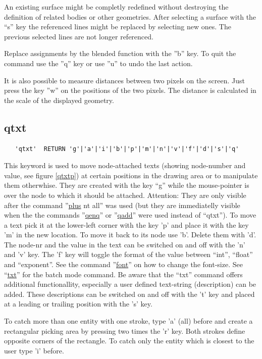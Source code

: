\documentclass{article}
\providecommand{\htmlref}[2]{\hyperref[#2]{#1}}
\begin{document}
An existing surface might be completly redefined without destroying the definition of related bodies or other geometries. After selecting a surface with the ``s'' key the referenced lines might be replaced by selecting new ones. The previous selected lines are not longer referenced.

Replace assignments by the blended function with the ''b'' key. To quit the command use the ''q'' key or use ''u'' to undo the last action. 

It is also possible to measure distances between two pixels on the screen. Just press the key ''w'' on the positions of the two pixels. The distance is calculated in the scale of the displayed geometry. 

\subsection{\label{qtxt}qtxt}
\begin{verbatim}
   'qtxt'  RETURN 'g'|'a'|'i'|'b'|'p'|'m'|'n'|'v'|'f'|'d'|'s'|'q' 
\end{verbatim}
This keyword is used to move node-attached texts (showing node-number and value, see figure \ref{qtxtp}) at certain positions in the drawing area or to manipulate them otherwhise. They are created with the key ``g'' while the mouse-pointer is over the node to which it should be attached. Attention: They are only visible after the command ''\htmlref{plus}{plus} nt all'' was used (but they are immediatelly visible when the the commands ''\htmlref{qenq}{qenq}'' or ''\htmlref{qadd}{qadd}'' were used instead of ``qtxt''). To move a text pick it at the lower-left corner with the key 'p' and place it with the key 'm' in the new location. To move it back to its node use 'b'. Delete them with 'd'. The node-nr and the value in the text can be switched on and off with the 'n' and 'v' key. The 'f' key will toggle the format of the value between ``int'', ``float'' and ``exponent''. See the command ''\htmlref{font}{font}'' on how to change the font-size. See ``\htmlref{txt}{txt}'' for the batch mode command. Be aware that the ``txt'' command offers additional functionallity, especially a user defined text-string (description) can be added. These descriptions can be switched on and off with the 't' key and placed at a leading or trailing position with the 's' key.

To catch more than one entity with one stroke, type 'a' (all) before and create a rectangular picking area by pressing two times the 'r' key. Both strokes define opposite corners of the rectangle. To catch only the entity which is closest to the user type 'i' before.
  
\end{document}

